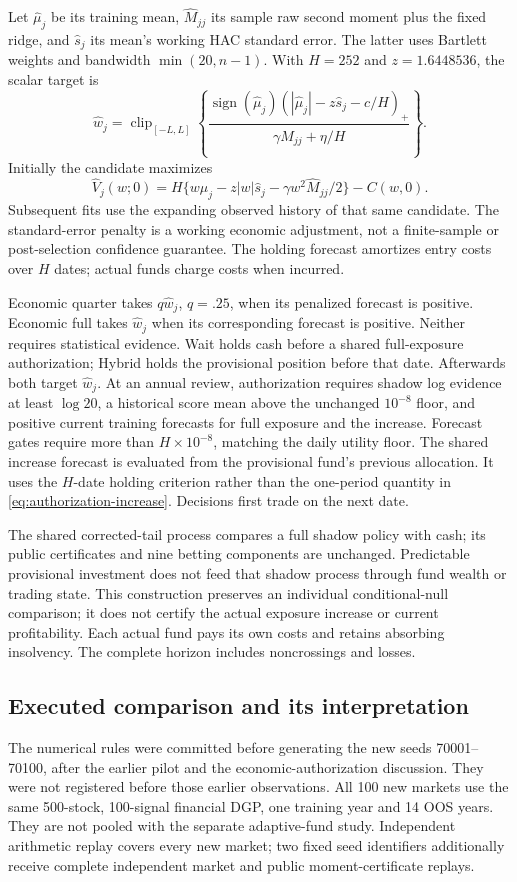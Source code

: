 Let $\widehat\mu_j$ be its training mean, $\widehat M_{jj}$ its sample raw
second moment plus the fixed ridge, and $\widehat s_j$ its mean's working HAC
standard error. The latter uses Bartlett weights and bandwidth
$\min(20,n-1)$. With $H=252$ and $z=1.6448536$, the scalar target is
\[
 \widehat w_j=\operatorname{clip}_{[-L,L]}
 \left\{\frac{\operatorname{sign}(\widehat\mu_j)
  (|\widehat\mu_j|-z\widehat s_j-c/H)_+}
  {\gamma\widehat M_{jj}+\eta/H}\right\}.
\]
Initially the candidate maximizes
\[
 \widehat V_j(w;0)
 =H\{w\widehat\mu_j-z|w|\widehat s_j
                 -\gamma w^2\widehat M_{jj}/2\}-C(w,0).
\]
Subsequent fits use the expanding observed history of that same candidate.
The standard-error penalty is a working economic adjustment, not a
finite-sample or post-selection confidence guarantee. The holding forecast
amortizes entry costs over $H$ dates; actual funds charge costs when incurred.

Economic quarter takes $q\widehat w_j$, $q=.25$, when its penalized forecast
is positive. Economic full takes $\widehat w_j$ when its corresponding
forecast is positive. Neither requires statistical evidence.
Wait holds cash before a shared full-exposure authorization; Hybrid holds
the provisional position before that date. Afterwards both target
$\widehat w_j$. At an annual review, authorization requires shadow log
evidence at least $\log20$, a historical score mean above the unchanged
$10^{-8}$ floor, and positive current training forecasts for full exposure
and the increase. Forecast gates require more than $H\times10^{-8}$,
matching the daily utility floor. The shared increase forecast is evaluated from the
provisional fund's previous allocation. It uses the $H$-date holding
criterion rather than the one-period quantity in
\eqref{eq:authorization-increase}. Decisions first trade on the next date.

The shared corrected-tail process compares a full shadow policy with cash;
its public certificates and nine betting components are unchanged. Predictable
provisional investment does not feed that shadow process through fund wealth
or trading state. This construction preserves an individual conditional-null
comparison; it does not certify the actual exposure increase or current
profitability. Each actual fund pays its own costs and retains absorbing
insolvency. The complete horizon includes noncrossings and losses.

\subsection{Executed comparison and its interpretation}
The numerical rules were committed before generating the new seeds
70001--70100, after the earlier pilot and the economic-authorization discussion.
They were not registered before those earlier observations. All 100 new
markets use the same 500-stock, 100-signal financial DGP, one training year
and 14 OOS years. They are not pooled with the separate adaptive-fund study.
Independent arithmetic replay covers every new market; two fixed seed
identifiers additionally receive complete independent market and public
moment-certificate replays.

